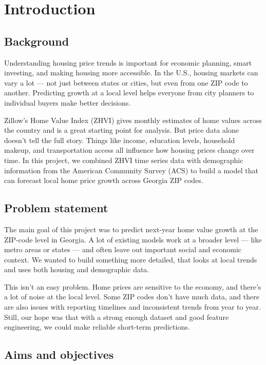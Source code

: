 \chapter{Introduction}
\label{ch:into}

\section{Background}
\label{sec:into_back}

Understanding housing price trends is important for economic planning, smart investing, and making housing more accessible. In the U.S., housing markets can vary a lot — not just between states or cities, but even from one ZIP code to another. Predicting growth at a local level helps everyone from city planners to individual buyers make better decisions.

Zillow’s Home Value Index (ZHVI) gives monthly estimates of home values across the country and is a great starting point for analysis. But price data alone doesn’t tell the full story. Things like income, education levels, household makeup, and transportation access all influence how housing prices change over time. In this project, we combined ZHVI time series data with demographic information from the American Community Survey (ACS) to build a model that can forecast local home price growth across Georgia ZIP codes.

\section{Problem statement}
\label{sec:intro_prob_art}

The main goal of this project was to predict next-year home value growth at the ZIP-code level in Georgia. A lot of existing models work at a broader level — like metro areas or states — and often leave out important social and economic context. We wanted to build something more detailed, that looks at local trends and uses both housing and demographic data.

This isn’t an easy problem. Home prices are sensitive to the economy, and there’s a lot of noise at the local level. Some ZIP codes don’t have much data, and there are also issues with reporting timelines and inconsistent trends from year to year. Still, our hope was that with a strong enough dataset and good feature engineering, we could make reliable short-term predictions.

\section{Aims and objectives}
\label{sec:intro_aims_obj}

